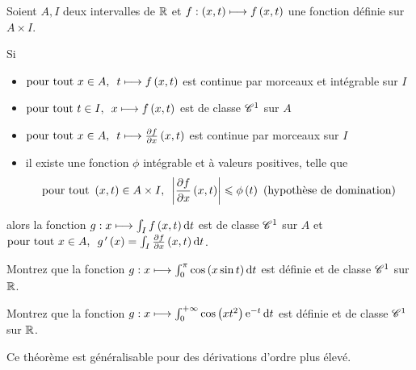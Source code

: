 \begin{theo}
Soient \(A,I\) deux intervalles de \(\mathbb{R}\) et \(f:\left(x,t\right)\longmapsto f\left(x,t\right)\) une fonction définie sur \(A\times I\).

Si

\begin{itemize}
    \item \(\quantifs{\tpt x\in A}t\mapsto f\paren{x,t}\) est continue par morceaux et intégrable sur \(I\) \\
    \item \(\quantifs{\tpt t\in I}x\mapsto f\paren{x,t}\) est de classe \(\mathscr{C}^{1}\) sur \(A\) \\
    \item \(\quantifs{\tpt x\in A}t\mapsto\pdv{f}{x}\paren{x,t}\) est continue par morceaux sur \(I\) \\
    \item il existe une fonction \(\phi\) intégrable et à valeurs positives, telle que \[\quantifs{\tpt\paren{x,t}\in A\times I}\abs{\pdv{f}{x}\paren{x,t}}\leq\phi\paren{t}\text{ (hypothèse de domination)}\]
\end{itemize}

alors la fonction \(g:x\mapsto\int_If\paren{x,t}\odif{t}\) est de classe \(\mathscr{C}^{1}\) sur \(A\) et \(\quantifs{\tpt x\in A}g\prim\paren{x}=\int_I\pdv{f}{x}\paren{x,t}\odif{t}\).
\end{theo}

\begin{exo}
Montrez que la fonction \(g:x\mapsto\int_0^\pi\cos\paren{x\sin t}\odif{t}\) est définie et de classe \(\mathscr{C}^{1}\) sur \(\mathbb{R}\).
\end{exo}

\begin{exo}
Montrez que la fonction \(g:x\mapsto\int_0^{\pinf}\cos\paren{xt^2}\e{-t}\odif{t}\) est définie et de classe \(\mathscr{C}^{1}\) sur \(\mathbb{R}\).
\end{exo}

Ce théorème est généralisable pour des dérivations d'ordre plus élevé.

